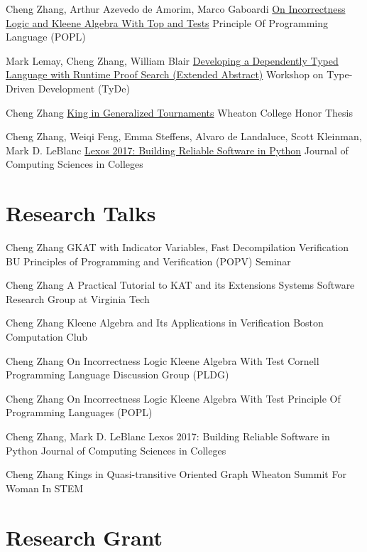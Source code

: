 \documentclass[10pt]{moderncv}        %
\let\oldsection=\section
\renewcommand{\section}{%
  \needspace{\baselineskip}
  \oldsection
}
\begin{document}
{Cheng Zhang, Arthur Azevedo de Amorim, Marco Gaboardi}
{\href{https://arxiv.org/abs/2108.07707}{On Incorrectness Logic and Kleene Algebra With Top and Tests}}
{Principle Of Programming Language (POPL)}
{}{}

{Mark Lemay, Cheng Zhang, William Blair}
{\href{https://icfp20.sigplan.org/details/tyde-2020-papers/7/Developing-a-Dependently-Typed-Language-with-Runtime-Proof-Search-Extended-Abstract-}
{Developing a Dependently Typed Language with Runtime Proof Search (Extended Abstract)}}
{Workshop on Type-Driven Development (TyDe)}
{}{}

{Cheng Zhang}
{\href{http://hdl.handle.net/11040/24570}{King in Generalized Tournaments}}
{Wheaton College Honor Thesis}
{}{}

{Cheng Zhang, Weiqi Feng, Emma Steffens, Alvaro de Landaluce, Scott Kleinman, Mark D. LeBlanc}
{\href{https://dl.acm.org/doi/10.5555/3205191.3205205}{Lexos 2017: Building Reliable Software in Python}}
{Journal of Computing Sciences in Colleges}
{}{}


\section{Research Talks}

{Cheng Zhang}
{GKAT with Indicator Variables, Fast Decompilation Verification}
{BU Principles of Programming and Verification (POPV) Seminar}
{}{}

{Cheng Zhang}
{A Practical Tutorial to KAT and its Extensions}
{Systems Software Research Group at Virginia Tech}
{}{}

{Cheng Zhang}
{Kleene Algebra and Its Applications in Verification}
{Boston Computation Club}
{}{}

{Cheng Zhang}
{On Incorrectness Logic Kleene Algebra With Test}
{Cornell Programming Language Discussion Group (PLDG)}
{}{}

{Cheng Zhang}
{On Incorrectness Logic Kleene Algebra With Test}
{Principle Of Programming Languages (POPL)}
{}{}

{Cheng Zhang, Mark D. LeBlanc}
{Lexos 2017: Building Reliable Software in Python}
{Journal of Computing Sciences in Colleges}
{}{}

{Cheng Zhang}
{Kings in Quasi-transitive Oriented Graph}
{Wheaton Summit For Woman In STEM}
{}{}

\section{Research Grant}
\end{document}
